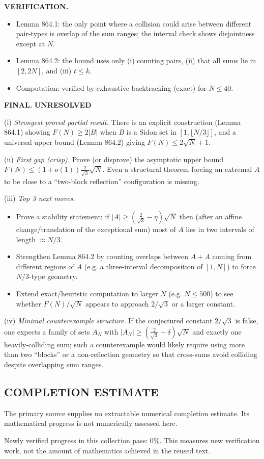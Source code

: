 \medskip
\noindent\textbf{VERIFICATION.}
\begin{itemize}
\item Lemma 864.1: the only point where a collision could arise between different pair-types is overlap of the sum ranges; the interval check shows disjointness except at $N$.
\item Lemma 864.2: the bound uses only (i) counting pairs, (ii) that all sums lie in $[2,2N]$, and (iii) $t\le k$.
\item Computation: verified by exhaustive backtracking (exact) for $N\le 40$.
\end{itemize}

\medskip
\noindent\textbf{FINAL.} \textbf{UNRESOLVED}

(i) \emph{Strongest proved partial result.}
There is an explicit construction (Lemma 864.1) showing $F(N)\ge 2|B|$ when $B$ is a Sidon set in $[1,\lfloor N/3\rfloor]$, and a universal upper bound (Lemma 864.2) giving $F(N)\le 2\sqrt N+1$.

(ii) \emph{First gap (crisp).}
Prove (or disprove) the asymptotic upper bound
$F(N)\le (1+o(1))\tfrac{2}{\sqrt 3}\sqrt N$.
Even a structural theorem forcing an extremal $A$ to be close to a ``two-block reflection'' configuration is missing.

(iii) \emph{Top 3 next moves.}
\begin{itemize}
\item Prove a stability statement: if $|A|\ge (\tfrac{2}{\sqrt 3}-\eta)\sqrt N$ then (after an affine change/translation of the exceptional sum) most of $A$ lies in two intervals of length $\approx N/3$.
\item Strengthen Lemma 864.2 by counting overlaps between $A+A$ coming from different regions of $A$ (e.g. a three-interval decomposition of $[1,N]$) to force $N/3$-type geometry.
\item Extend exact/heuristic computation to larger $N$ (e.g. $N\le 500$) to see whether $F(N)/\sqrt N$ appears to approach $2/\sqrt 3$ or a larger constant.
\end{itemize}

(iv) \emph{Minimal counterexample structure.}
If the conjectured constant $2/\sqrt 3$ is false, one expects a family of sets $A_N$ with $|A_N|\ge (\tfrac{2}{\sqrt 3}+\delta)\sqrt N$ and exactly one heavily-colliding sum; such a counterexample would likely require using more than two ``blocks'' or a non-reflection geometry so that cross-sums avoid colliding despite overlapping sum ranges.




\subsection*{COMPLETION ESTIMATE}
The primary source supplies no extractable numerical completion estimate. Its mathematical progress is not numerically assessed here.

Newly verified progress in this collection pass: $0\%$. This measures new verification work, not the amount of mathematics achieved in the reused text.
